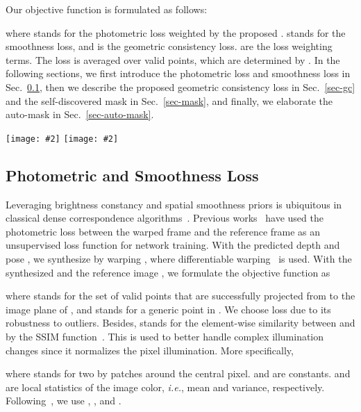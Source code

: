 \documentclass[twocolumn]{svjour3}
\renewcommand{\cite}[1]{\textcolor{blue}{\citep{#1}}}
\def\ie{\emph{i.e.}}
\newcommand{\secref}[1]{Sec.~\ref{#1}}
\newcommand{\addImg}[2][0.495]{\texttt{[image: \#2]}}
\begin{document}
Our objective function is formulated as follows:

where  stands for the photometric loss  weighted by the proposed . 
 stands for the smoothness loss, 
and  is the geometric consistency loss.
 are the loss weighting terms.
The loss is averaged over valid points, which are determined by .
In the following sections, we first introduce the photometric loss and smoothness loss in \secref{sec-photo-smooth}, 
then we describe the proposed geometric consistency loss  in \secref{sec-gc} and the self-discovered mask  in \secref{sec-mask},
and finally, we elaborate the auto-mask  in \secref{sec-auto-mask}.


\begin{figure*}[t]
  \centering
  \addImg{fig-a.pdf}
  \addImg{fig-b.pdf}
  \caption{Visual results of depth and masking. 
  Top to bottom: sample image, estimated depth, 
  self-discovered mask , and auto-mask  \cite{monodepth2}.
  The proposed  detects dynamics and occlusions (dark regions),
  and the binary mask  finds invalid stationary points (black pixels).}
  \label{fig:show}
\end{figure*}

\subsection{Photometric and Smoothness Loss}\label{sec-photo-smooth}

Leveraging brightness constancy and spatial smoothness priors is ubiquitous 
in classical dense correspondence algorithms~\cite{baker2004lucas}.
Previous works~\cite{zhou2017unsupervised,yin2018geonet,ranjan2019cc} 
have used the photometric loss between the warped frame and 
the reference frame as an unsupervised loss function for network training.
With the predicted depth  and pose , 
we synthesize  by warping , 
where differentiable warping~\cite{jaderberg2015stn} 
is used.
With the synthesized  and the reference image , 
we formulate the objective function as

where  stands for the set of valid points that are successfully 
projected from  to the image plane of ,
and  stands for a generic point in .
We choose  loss due to its robustness to outliers.
Besides,  stands for the element-wise similarity between 
 and  by the SSIM function~\cite{wang2004image}.
This is used to better handle complex illumination changes since it normalizes the pixel illumination.
More specifically,

where  stands for two  by  patches around the central pixel.
 and  are constants.
 and  are local statistics of the image color, 
\ie, mean and variance, respectively.
Following~\cite{godard2017unsupervised, yin2018geonet, ranjan2019cc}, 
we use , , and .
\end{document}
